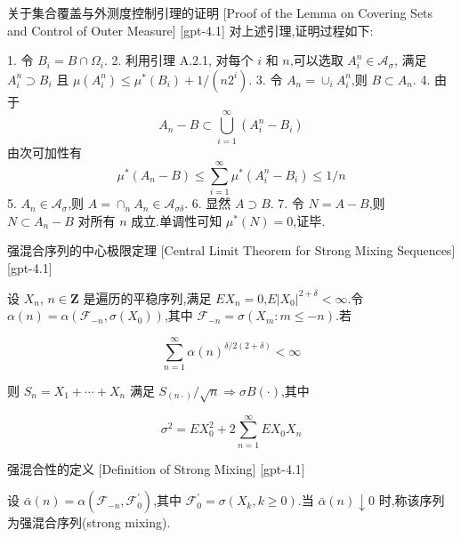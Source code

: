 \documentclass[UTF8]{ctexart}
\begin{document}
    
    
    \begin{prf}
        {关于集合覆盖与外测度控制引理的证明}
        [Proof of the Lemma on Covering Sets and Control of Outer Measure]
        [gpt-4.1]
        对上述引理,证明过程如下:

1. 令 $B_i = B \cap \Omega_i$.
2. 利用引理 A.2.1, 对每个 $i$ 和 $n$,可以选取 $A_i^n \in \mathcal{A}_{\sigma}$, 满足 $A_i^n \supset B_i$ 且 $\mu(A_i^n) \leq \mu^*(B_i) + 1/(n 2^i)$.
3. 令 $A_n = \cup_i A_i^n$,则 $B \subset A_n$.
4. 由于
\[
A_n - B \subset \bigcup_{i=1}^{\infty}(A_i^n - B_i)
\]
由次可加性有
\[
\mu^*(A_n - B) \leq \sum_{i=1}^{\infty} \mu^*(A_i^n - B_i) \leq 1/n
\]
5. $A_n \in \mathcal{A}_{\sigma}$,则 $A = \cap_n A_n \in \mathcal{A}_{\sigma\delta}$.
6. 显然 $A \supset B$.
7. 令 $N = A - B$,则 $N \subset A_n - B$ 对所有 $n$ 成立.单调性可知 $\mu^*(N) = 0$,证毕.
    \end{prf}
    
    
    
    \begin{thm}
        {强混合序列的中心极限定理}
        [Central Limit Theorem for Strong Mixing Sequences]
        [gpt-4.1]
        
设 $X_{n}$, $n \in \mathbf{Z}$ 是遍历的平稳序列,满足 $E X_{n} = 0$,$E | X_{0} |^{2+\delta} < \infty$.令 $\alpha(n) = \alpha( \mathcal{F}_{-n}, \sigma(X_{0}) )$,其中 $\mathcal{F}_{-n} = \sigma( X_{m} : m \leq -n )$.若

\[
\sum_{n=1}^{\infty} \alpha(n)^{\delta / 2(2+\delta)} < \infty
\]

则 $S_{n} = X_{1} + \cdots + X_{n}$ 满足 $S_{(n\cdot)} / \sqrt{n} \Rightarrow \sigma B(\cdot)$,其中

\[
\sigma^{2} = E X_{0}^{2} + 2 \sum_{n=1}^{\infty} E X_{0} X_{n}
\]

    \end{thm}
    
    
    
    \begin{dfn}
        {强混合性的定义}
        [Definition of Strong Mixing]
        [gpt-4.1]
        
设 $\bar{\alpha}(n) = \alpha( \mathcal{F}_{-n}, \mathcal{F}_{0}^{\prime} )$,其中 $\mathcal{F}_{0}^{\prime} = \sigma( X_{k}, k \geq 0 )$.当 $\bar{\alpha}(n) \downarrow 0$ 时,称该序列为强混合序列(strong mixing).

    \end{dfn}
    
\end{document}
